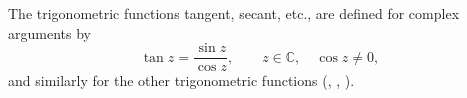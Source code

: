 The trigonometric functions tangent, secant, etc., are defined for complex arguments by
$$
\tan z = \frac{\sin z}{\cos z}, \qquad z \in \mathbb{C}, \quad \cos z \neq 0,
$$
and similarly for the other trigonometric functions (, , ).

